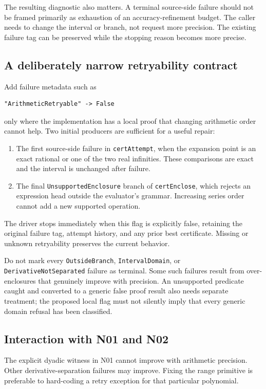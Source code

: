 \documentclass[11pt,a4paper]{article}
\newcommand{\code}[1]{\nolinkurl{#1}}
\begin{document}
The resulting diagnostic also matters. A terminal source-side failure should not be framed primarily as exhaustion of an accuracy-refinement budget. The caller needs to change the interval or branch, not request more precision. The existing failure tag can be preserved while the stopping reason becomes more precise.

\subsection{A deliberately narrow retryability contract}

Add failure metadata such as
\begin{lstlisting}
"ArithmeticRetryable" -> False
\end{lstlisting}
only where the implementation has a local proof that changing arithmetic order cannot help. Two initial producers are sufficient for a useful repair:

\begin{enumerate}
\item The first source-side failure in \code{certAttempt}, when the expansion point is an exact rational or one of the two real infinities. These comparisons are exact and the interval is unchanged after failure.
\item The final \code{UnsupportedEnclosure} branch of \code{certEnclose}, which rejects an expression head outside the evaluator's grammar. Increasing series order cannot add a new supported operation.
\end{enumerate}

The driver stops immediately when this flag is explicitly false, retaining the original failure tag, attempt history, and any prior best certificate. Missing or unknown retryability preserves the current behavior.

Do not mark every \code{OutsideBranch}, \code{IntervalDomain}, or \code{DerivativeNotSeparated} failure as terminal. Some such failures result from over-enclosures that genuinely improve with precision. An unsupported predicate caught and converted to a generic false proof result also needs separate treatment; the proposed local flag must not silently imply that every generic domain refusal has been classified.

\subsection{Interaction with N01 and N02}

The explicit dyadic witness in N01 cannot improve with arithmetic precision. Other derivative-separation failures may improve. Fixing the range primitive is preferable to hard-coding a retry exception for that particular polynomial.
\end{document}
